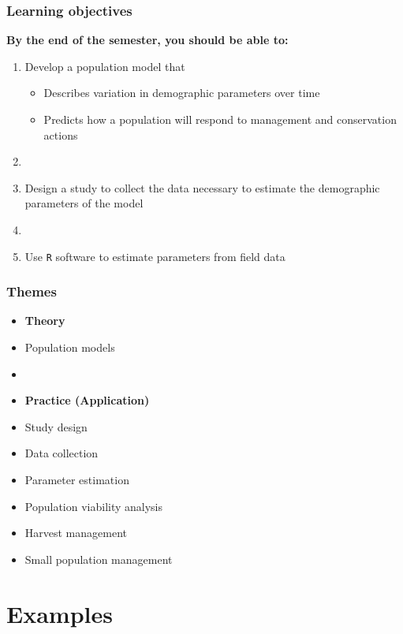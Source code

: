 \documentclass[color=usenames,dvipsnames]{beamer}
\begin{document}
\begin{frame}
  \frametitle{Learning objectives}
  \large
  {\bf By the end of the semester, you should be able to: \\}
  \vspace{0.3cm}
  \begin{enumerate}[\bf 1.]
    \large
    \item<1-> Develop a population model that
      \begin{itemize}
        \normalsize %
        \item Describes variation in demographic parameters over time
        \item Predicts how a population will respond to
          management and conservation actions
      \end{itemize}
    \item[]
    \item<2-> Design a study to collect the data necessary to estimate
      the demographic parameters of the model
    \item[]
    \item<3-> Use {\tt R} software to estimate parameters from field data
  \end{enumerate}
\end{frame}



\begin{frame}
  \frametitle{Themes}
  \large
  \begin{itemize}
    \item[] {\hspace{-0.9cm} \bf Theory}
    \item Population models
    \item[]
    \item[] {\hspace{-0.9cm} \bf Practice (Application)}
    \item Study design
    \item Data collection
    \item Parameter estimation
    \item Population viability analysis
    \item Harvest management
    \item Small population management
  \end{itemize}
\end{frame}



\section{Examples}
\end{document}
